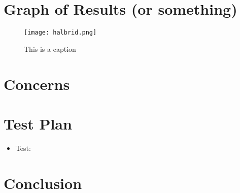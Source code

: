 \documentclass{report}
\begin{document}
\section{Graph of Results (or something)}
\lipsum[5]
\begin{figure}[H]
    \centering
    \texttt{[image: halbrid.png]}
    \caption{This is a caption}
\end{figure}

\section{Concerns}
\lipsum[7]

\section{Test Plan}
\begin{itemize}[topsep=-8pt, itemsep=0pt]
\item Test:
    \lipsum[8]
\end{itemize}

\section{Conclusion}
\lipsum[9]
\end{document}

